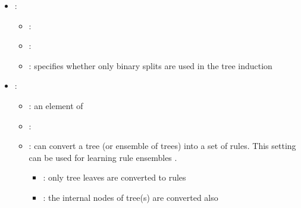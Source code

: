 \begin{itemize}
\begin{itemize}
           \end{itemize}
    \item {}:
           \begin{itemize}
                \item \optionPossibleValues{}: 
                \item \optionDefaultValue{}: 
                \item \optionDescrption{}: specifies whether only binary splits are used in the tree induction
           \end{itemize}
    \item {}:
           \begin{itemize}
                \item \optionPossibleValues{}: an element of 
                \item \optionDefaultValue{}: 
                \item \optionDescrption{}:  \clus{} can convert a tree (or ensemble of trees) into a set of rules. This setting can be used for learning rule ensembles \cite{Aho2009}.
                \begin{itemize}
                    \item {}: only tree leaves are converted to rules
                    \item {}: the internal nodes of tree(s) are converted also
                \end{itemize}
           \end{itemize}
\end{itemize}
